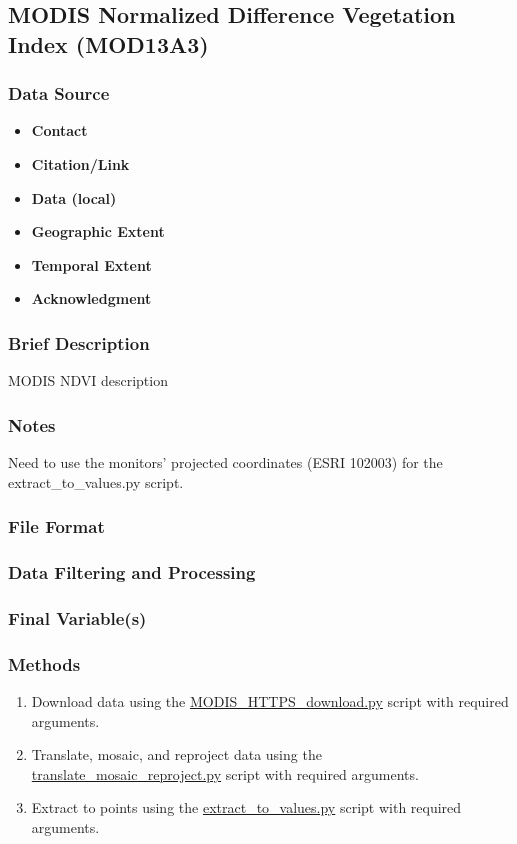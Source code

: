 \subsection{MODIS Normalized Difference Vegetation Index (MOD13A3)}
\subsubsection*{Data Source}
\begin{itemize}[nolistsep]
\item \textbf{Contact}
\item \textbf{Citation/Link}
\item \textbf{Data (local)}
\item \textbf{Geographic Extent}
\item \textbf{Temporal Extent}
\item \textbf{Acknowledgment}
\end{itemize}
\subsubsection*{Brief Description}

MODIS NDVI description

\subsubsection*{Notes}
Need to use the monitors' projected coordinates (ESRI 102003) for the extract\_to\_values.py script.
\subsubsection*{File Format}
\subsubsection*{Data Filtering and Processing}
\subsubsection*{Final Variable(s)}
\subsubsection*{Methods}
\begin{enumerate}
\item Download data using the \href{https://github.com/earthlab/estimate-pm25/blob/master/download-earth-observations/MODIS\_HTTPS\_download.py}{MODIS\_HTTPS\_download.py} script with required arguments.
\item Translate, mosaic, and reproject data using the \href{https://github.com/earthlab/estimate-pm25/blob/master/download-earth-observations/MODIS_NDVI/translate\_mosaic\_reproject.py}{translate\_mosaic\_reproject.py} script with required arguments.
\item Extract to points using the \href{https://github.com/earthlab/estimate-pm25/blob/master/download-earth-observations/MODIS\_NDVI/extract\_to\_values.py}{extract\_to\_values.py} script with required arguments.
\end{enumerate}
